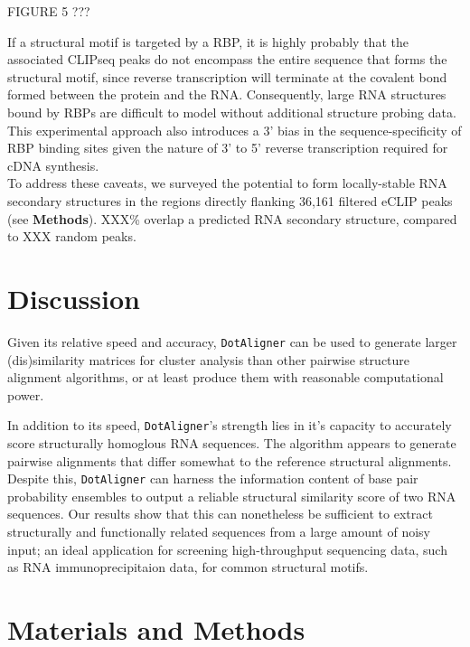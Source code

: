 \documentclass[a4paper,11pt]{article}
\newcommand\dotaligner{\texttt{DotAligner}}
\begin{document}
\begin{center}
FIGURE 5 ??? 
\end{center}

If a structural motif is targeted by a RBP, it is highly probably that the associated CLIPseq peaks 
do not encompass the entire sequence that forms the structural motif, since 
reverse transcription will terminate at the covalent bond formed between the 
protein and the RNA. Consequently, large RNA structures bound by RBPs are 
difficult to model without additional structure probing data. This experimental 
approach also introduces a 3' bias in the sequence-specificity of RBP binding sites 
given the nature of 3' to 5' reverse transcription required for cDNA synthesis.\\

To address these caveats, we surveyed the potential to form locally-stable
RNA secondary structures in the regions directly flanking 36,161 filtered eCLIP 
peaks (see \textbf{Methods}). XXX\% overlap a predicted RNA secondary structure, 
compared to XXX random peaks. \\


\section*{Discussion}
Given its relative speed and accuracy, \dotaligner{} can be used to generate larger 
(dis)similarity matrices for cluster analysis than other pairwise structure 
alignment algorithms, or at least produce them with reasonable computational 
power.  

In addition to its speed, \dotaligner{}'s strength lies in it's capacity to accurately
score structurally homoglous RNA sequences. The algorithm appears to 
generate pairwise alignments that differ somewhat to the reference 
structural alignments. Despite this, \dotaligner{} can harness the information
content of base pair probability ensembles to output a reliable 
structural similarity score of two RNA sequences. Our results show that this
can nonetheless be sufficient to extract structurally and functionally related
sequences from a large amount of noisy input; an ideal application 
for screening high-throughput sequencing data, such as RNA 
immunoprecipitaion data, for common structural motifs. 

\section*{ Materials and Methods }
\end{document}

